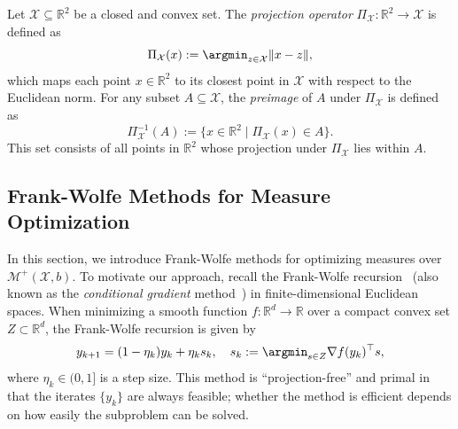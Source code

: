 \documentclass[stsy,sglanonrev]{informs4}
\begin{document}
\begin{definition}\label{def:projection} Let $\mathcal{X} \subseteq \mathbb{R}^2$ be a closed and convex set. The \emph{projection operator} $\Pi_{\mathcal{X}}: \mathbb{R}^2 \to \mathcal{X}$ is defined as
\begin{equation}
    \Pi_{\mathcal{X}}(x) := \argmin_{z \in \mathcal{X}} \|x - z\|,
\end{equation}
which maps each point $x \in \mathbb{R}^2$ to its closest point in $\mathcal{X}$ with respect to the Euclidean norm.
For any subset $A \subseteq \mathcal{X}$, the \emph{preimage} of $A$ under $\Pi_{\mathcal{X}}$ is defined as
\begin{equation}
    \Pi^{-1}_{\mathcal{X}}(A) := \{ x \in \mathbb{R}^2 \mid \Pi_{\mathcal{X}}(x) \in A \}.
\end{equation}
This set consists of all points in $\mathbb{R}^2$ whose projection under $\Pi_{\mathcal{X}}$ lies within $A$.
\end{definition}

\subsection{Frank-Wolfe Methods for Measure Optimization}\label{sec:fw_methods}

In this section, we introduce Frank-Wolfe methods for optimizing measures over $\mathcal{M}^+(\mathcal{X},b)$. To motivate our approach, recall the Frank-Wolfe recursion~\cite{1978dunhar} (also known as the \emph{conditional gradient} method~\cite{2015bub}) in finite-dimensional Euclidean spaces. When minimizing a smooth function \( f: \mathbb{R}^d \to \mathbb{R} \) over a compact convex set \( Z \subset \mathbb{R}^d \), the Frank-Wolfe recursion is given by
\begin{equation} \label{eq:FW}
    y_{k+1} = (1 - \eta_k)y_k + \eta_k s_k, \quad s_k := \argmin_{s \in Z} \nabla f(y_k)^\top s,
\end{equation}
where \( \eta_k \in (0,1] \) is a step size. This method is ``projection-free'' and primal in that the iterates \( \{y_k\} \) are always feasible; whether the method is efficient depends on how easily the subproblem can be solved.
\end{document}
